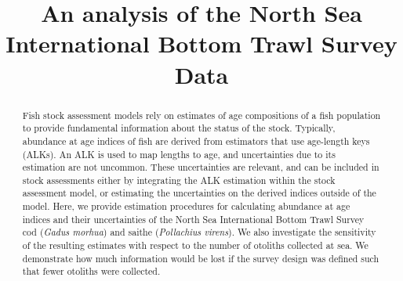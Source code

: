 \documentclass[a4paper 12pt]{article}
\title{\bf 
}
\author{}
\date{}
\numberwithin{equation}{section}
\begin{document}
\title{An analysis of the North Sea International Bottom Trawl Survey Data}

\maketitle


\begin{abstract}
Fish stock assessment models rely on estimates of age compositions of a fish population to provide fundamental information about the status of the stock. Typically,  abundance at age indices of fish are derived from estimators that use age-length keys (ALKs). An ALK is used to map lengths to age, and uncertainties due to its estimation are not uncommon. These uncertainties are relevant, and can be included in stock assessments either by integrating the ALK estimation within the stock assessment model, or estimating the uncertainties on the derived indices outside of the model. Here, we provide estimation procedures for calculating abundance at age indices and their uncertainties of the North Sea International Bottom Trawl Survey cod (\textit{Gadus morhua}) and saithe (\textit{Pollachius virens}). We also investigate the sensitivity of the resulting estimates with respect to the number of otoliths collected at sea. We demonstrate how much information would be lost if the survey design was defined such that fewer otoliths were collected.



\end{abstract}
\end{document}

